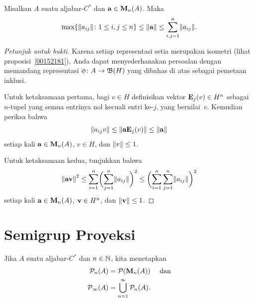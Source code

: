 \begin{prop} Misalkan $A$ suatu aljabar-$C^*$ dan $\mathbf{a} \in \mathbf{M}_{n}({A})$. Maka
   \[ \max\{\lVert a_{ij}\rVert\colon 1 \le i,j \le n\} \le \lVert\mathbf{a}\rVert \le \sum_{i,j = 1}^n \lVert a_{ij}\rVert. \]
\end{prop}

\begin{proof}[\emph{Petunjuk untuk bukti}] Karena setiap representasi setia merupakan isometri (lihat proposisi~\ref{00152181}),
Anda dapat menyederhanakan persoalan dengan memandang representasi $\phi\colon A \rightarrow \mathfrak{B}(H)$ yang dibahas di atas sebagai
pemetaan inklusi.

Untuk ketaksamaan pertama, bagi $v \in H$ definisikan vektor $\mathbf{E}_j(v) \in H^n$ sebagai $n$-tupel
yang semua entrinya nol kecuali entri ke-$j$, yang bernilai~$v$. Kemudian periksa bahwa
   \[ \lVert a_{ij}v\rVert \le \lVert\mathbf{a}\mathbf{E}_j(v)\rVert \le \lVert\mathbf{a}\rVert \]
setiap kali $\mathbf{a} \in \mathbf{M}_{n}({A})$, $v \in H$, dan $\lVert v\rVert \le 1$.

Untuk ketaksamaan kedua, tunjukkan bahwa
   \[ {\lVert\mathbf{a}\mathbf{v}\rVert}^2 \le \sum_{i=1}^n\biggl(\sum_{j=1}^n \lVert a_{ij}\rVert\biggr)^2 \le \biggl(\sum_{i=1}^n\sum_{j=1}^n \lVert a_{ij}\rVert\biggr)^2 \]
setiap kali $\mathbf{a} \in \mathbf{M}_{n}({A})$, $\mathbf{v} \in H^n$, dan $\lVert\mathbf{v}\rVert \le 1$.    \ns
\end{proof}


























\section{Semigrup Proyeksi}

\begin{notn} Jika $A$ suatu aljabar-$C^*$ dan $n \in \mathbb{N}$, kita menetapkan
  \begin{align*}
       \mathcal{P}_n(A) &= \mathcal{P}(\mathbf{M}_{n}({A})) \quad\text{ dan} \\
       \mathcal{P}_\infty(A) &= \bigcup_{n=1}^\infty \mathcal{P}_n(A).
  \end{align*}
\end{notn}

